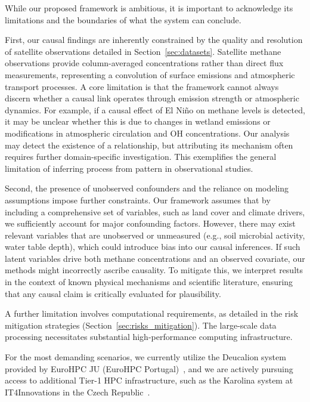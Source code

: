 While our proposed framework is ambitious, it is important to acknowledge its limitations and the boundaries of what the system can conclude.

First, our causal findings are inherently constrained by the quality and resolution of satellite observations detailed in Section~\ref{sec:datasets}. Satellite methane observations provide column-averaged concentrations rather than direct flux measurements, representing a convolution of surface emissions and atmospheric transport processes. A core limitation is that the framework cannot always discern whether a causal link operates through emission strength or atmospheric dynamics. For example, if a causal effect of El Niño on methane levels is detected, it may be unclear whether this is due to changes in wetland emissions or modifications in atmospheric circulation and OH concentrations. Our analysis may detect the existence of a relationship, but attributing its mechanism often requires further domain-specific investigation. This exemplifies the general limitation of inferring process from pattern in observational studies.

Second, the presence of unobserved confounders and the reliance on modeling assumptions impose further constraints. Our framework assumes that by including a comprehensive set of variables, such as land cover and climate drivers, we sufficiently account for major confounding factors. However, there may exist relevant variables that are unobserved or unmeasured (e.g., soil microbial activity, water table depth), which could introduce bias into our causal inferences. If such latent variables drive both methane concentrations and an observed covariate, our methods might incorrectly ascribe causality. To mitigate this, we interpret results in the context of known physical mechanisms and scientific literature, ensuring that any causal claim is critically evaluated for plausibility.

A further limitation involves computational requirements, as detailed in the risk mitigation strategies (Section~\ref{sec:risks_mitigation}). The large-scale data processing necessitates substantial high-performance computing infrastructure.

For the most demanding scenarios, we currently utilize the Deucalion system provided by EuroHPC JU (EuroHPC Portugal)~\cite{eurohpc-deucalion}, and we are actively pursuing access to additional Tier-1 HPC infrastructure, such as the Karolina system at IT4Innovations in the Czech Republic~\cite{it4i-karolina}.

